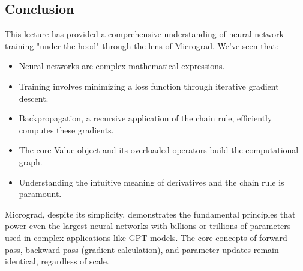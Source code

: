 \subsection{Conclusion} 
This lecture has provided a comprehensive understanding of neural network training "under the hood" through the lens of Micrograd. We've seen that: 
\begin{itemize} 
\item Neural networks are complex mathematical expressions. 
\item Training involves minimizing a loss function through iterative gradient descent. 
\item Backpropagation, a recursive application of the chain rule, efficiently computes these gradients. 
\item The core Value object and its overloaded operators build the computational graph. 
\item Understanding the intuitive meaning of derivatives and the chain rule is paramount. 
\end{itemize} 
Micrograd, despite its simplicity, demonstrates the fundamental principles that power even the largest neural networks with billions or trillions of parameters used in complex applications like GPT models. The core concepts of forward pass, backward pass (gradient calculation), and parameter updates remain identical, regardless of scale.